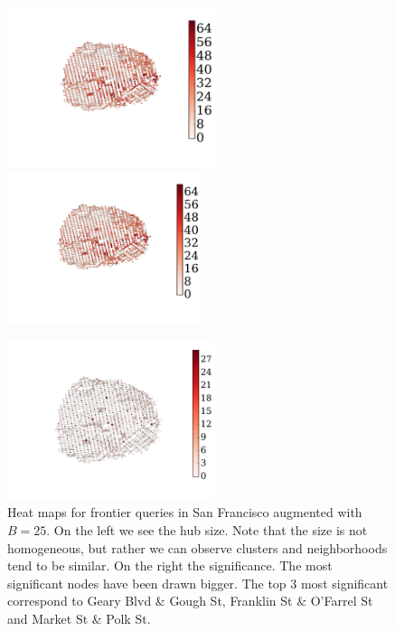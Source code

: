 \documentclass[a4paper,UKenglish]{lipics-v2016}
\theoremstyle{plain}
\begin{document}
\begin{figure}[h]
\begin{minipage}{.53\textwidth}
\includegraphics[clip, trim=4.6cm 4.8cm 4.7cm 3cm,height=4.7cm]{TexImg/SF_hub_sizes.pdf}%
\includegraphics[clip, trim=15.8cm 0cm 0.4cm 1cm,height=4.4cm]{TexImg/SF_hub_sizes.pdf}
\end{minipage}%
\begin{minipage}{.47\textwidth}
\flushright
\includegraphics[clip, trim=3.7cm 2.9cm 4.2cm 3cm,height=4.7cm]{TexImg/sig_colapse.pdf}
\end{minipage}
\caption{Heat maps for frontier queries in San Francisco augmented with $B=25$.
On the left we see the hub size. 
Note that the size is not homogeneous, but rather we can observe clusters and neighborhoods tend to be similar.
On the right the significance.
The most significant nodes have been drawn bigger.
The top 3 most significant correspond to Geary Blvd \& Gough St, Franklin St \& O'Farrel St and Market St \& Polk St.
}
\label{fig:heat_maps}
\end{figure}
\end{document}
